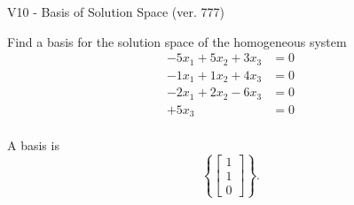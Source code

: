 \begin{exercise}
  \begin{exerciseTitle}V10 - Basis of Solution Space (ver. 777)\end{exerciseTitle}
  \begin{exerciseStatement}
    Find a basis for the solution space of the homogeneous system 
\begin{align*}
 -5 x_ 1 + 5 x_ 2 + 3 x_ 3 &= 0  \\ 
  -1 x_ 1 + 1 x_ 2 + 4 x_ 3 &= 0  \\ 
  -2 x_ 1 + 2 x_ 2 -6 x_ 3 &= 0  \\ 
  + 5 x_ 3 &= 0  \\ 
 \end{align*}


 
  \end{exerciseStatement}

  \begin{exerciseAnswer}
   A basis is   
\[\left\{\left[\begin{array}{c}
1 \\
1 \\
0
\end{array}\right]\right\}.\]

  


  \end{exerciseAnswer}
\end{exercise}